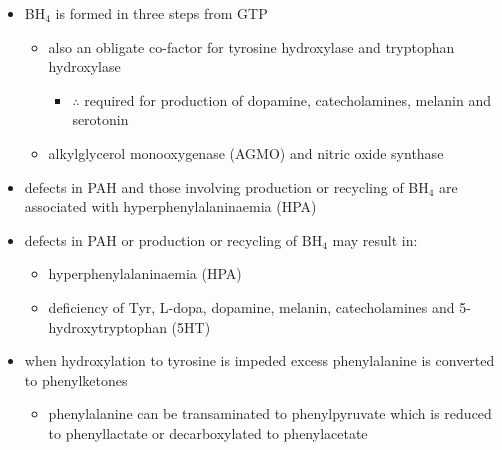 \documentclass{scrartcl}
\begin{document}
\begin{itemize}
\item BH\(_{\text{4}}\) is formed in three steps from GTP
\begin{itemize}
\item also an obligate co-factor for tyrosine hydroxylase and tryptophan hydroxylase
\begin{itemize}
\item \(\therefore\) required for production of dopamine, catecholamines,
melanin and serotonin
\end{itemize}
\item alkylglycerol monooxygenase (AGMO) and nitric oxide synthase
\end{itemize}

\item defects in PAH and those involving production or recycling of BH\(_{\text{4}}\)
are associated with hyperphenylalaninaemia (HPA)
\item defects in PAH or production or recycling of BH\(_{\text{4}}\) may result in:
\begin{itemize}
\item hyperphenylalaninaemia (HPA)
\item deficiency of Tyr, L-dopa, dopamine, melanin, catecholamines and 5-hydroxytryptophan (5HT)
\end{itemize}
\item when hydroxylation to tyrosine is impeded excess phenylalanine is converted to phenylketones
\begin{itemize}
\item phenylalanine can be transaminated to phenylpyruvate which is reduced to
phenyllactate or decarboxylated to phenylacetate
\end{itemize}
\end{itemize}
\end{document}
